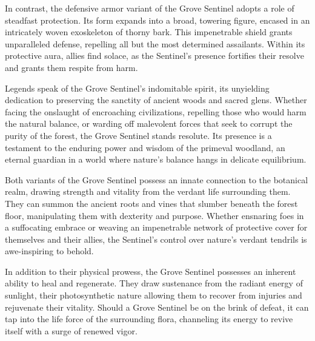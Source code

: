 In contrast, the defensive armor variant of the Grove Sentinel adopts a role of steadfast protection. Its form expands into a broad, towering figure, encased in an intricately woven exoskeleton of thorny bark. This impenetrable shield grants unparalleled defense, repelling all but the most determined assailants. Within its protective aura, allies find solace, as the Sentinel's presence fortifies their resolve and grants them respite from harm.

Legends speak of the Grove Sentinel's indomitable spirit, its unyielding dedication to preserving the sanctity of ancient woods and sacred glens. Whether facing the onslaught of encroaching civilizations, repelling those who would harm the natural balance, or warding off malevolent forces that seek to corrupt the purity of the forest, the Grove Sentinel stands resolute. Its presence is a testament to the enduring power and wisdom of the primeval woodland, an eternal guardian in a world where nature's balance hangs in delicate equilibrium.

 Both variants of the Grove Sentinel possess an innate connection to the botanical realm, drawing strength and vitality from the verdant life surrounding them. They can summon the ancient roots and vines that slumber beneath the forest floor, manipulating them with dexterity and purpose. Whether ensnaring foes in a suffocating embrace or weaving an impenetrable network of protective cover for themselves and their allies, the Sentinel's control over nature's verdant tendrils is awe-inspiring to behold.

 In addition to their physical prowess, the Grove Sentinel possesses an inherent ability to heal and regenerate. They draw sustenance from the radiant energy of sunlight, their photosynthetic nature allowing them to recover from injuries and rejuvenate their vitality. Should a Grove Sentinel be on the brink of defeat, it can tap into the life force of the surrounding flora, channeling its energy to revive itself with a surge of renewed vigor.

\vfill\eject %

